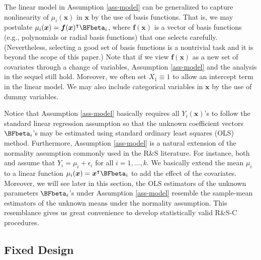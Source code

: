 \documentclass[ijoc,nonblindrev]{informs3}
\def\bx{{\bm x}}
\begin{document}
\begin{remark} \label{remark:linear}
The linear model in Assumption \ref{ass-model} can be generalized to capture nonlinearity of $\mu_i(\bx)$ in $\bx$ by the use of basis functions.
That is, we may postulate $\mu_i(\bx) = \bm f(\bx)^\intercal \BFbeta_i$, where $\bm f(\bx)$ is a vector of
basis functions (e.g., polynomials or radial basis functions) that one selects carefully.
(Nevertheless, selecting a good set of basis functions is a nontrivial task and it is beyond the scope of this paper.)
Note that if we view $\bm f(\bx)$ as a new set of covariates through a change of variables, Assumption \ref{ass-model} and the analysis in the sequel still hold.
Moreover, we often set $X_1 \equiv 1$ to allow an intercept term in the linear model.
We may also include categorical variables in $\bx$ by the use of dummy variables.
\end{remark}



Notice that Assumption \ref{ass-model} basically requires all $Y_i(\bx)$'s to follow the standard linear regression assumption \citep{james2013} so that the unknown coefficient vectors $\BFbeta_i$'s may be estimated using standard ordinary least squares (OLS) method.
Furthermore, Assumption \ref{ass-model} is a natural extension of the normality assumption commonly used in the R\&S literature.
For instance, both \cite{rinott1978} and \cite{kim2001} assume that $Y_i=\mu_i+\epsilon_i$ for all $i=1,\ldots,k$.
We basically extend the mean $\mu_i$ to a linear function $\mu_i(\bx)=\bx^\intercal \BFbeta_i$ to add the effect of the covariates.
Moreover, we will see later in this section, the OLS estimators of the unknown parameters $\BFbeta_i$'s under Assumption \ref{ass-model} resemble the sample-mean estimators of the unknown means under the normality assumption.
This resemblance gives us great convenience to develop statistically valid R\&S-C procedures.

\subsection{Fixed Design}
\end{document}
